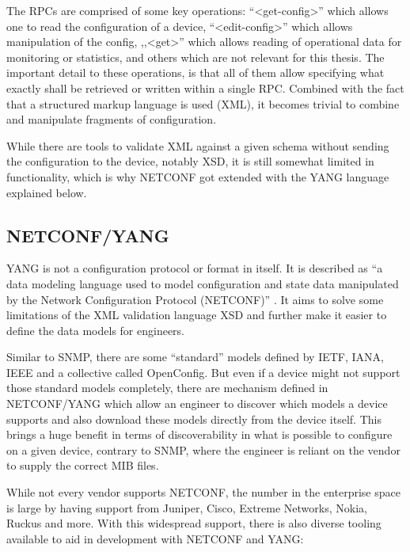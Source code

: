The \acrshort{RPC}s are comprised of some key operations: ``<get-config>'' which allows one to read
the configuration of a device, ``<edit-config>'' which allows manipulation of the config, ,,<get>''
which allows reading of operational data for monitoring or statistics, and others which are not
relevant for this thesis. 
The important detail to these operations, is that all of them allow specifying what exactly shall
be retrieved or written within a single \acrshort{RPC}. Combined with the fact that a structured
markup language is used (XML), it becomes trivial to combine and manipulate fragments of configuration.

While there are tools to validate XML against a given schema without sending the configuration to the device,
notably \acrfull{XSD}, it is still somewhat limited in functionality, 
which is why NETCONF got extended with the YANG language explained below.

\subsection{\label{theory:conf:yang}NETCONF/YANG}

YANG is not a configuration protocol or format in itself.
It is described as ``a data modeling language used to model configuration and
state data manipulated by the Network Configuration Protocol (NETCONF)'' .
It aims to solve some limitations of the XML validation language XSD and further make it
easier to define the data models for engineers.


Similar to SNMP, there are some ``standard'' models defined by \acrshort{IETF}, IANA, IEEE
and a collective called OpenConfig. But even if a device might not support those standard
models completely, there are mechanism defined in NETCONF/YANG which allow an engineer
to discover which models a device supports and also download these models directly from the
device itself. This brings a huge benefit in terms of discoverability in what is possible
to configure on a given device, contrary to SNMP, where the engineer is reliant on
the vendor to supply the correct MIB files.

While not every vendor supports NETCONF, the number in the enterprise space is large by
having support from Juniper, Cisco, Extreme Networks, Nokia, Ruckus and more.
With this widespread support, there is also diverse tooling available to aid in development
with NETCONF and YANG:

